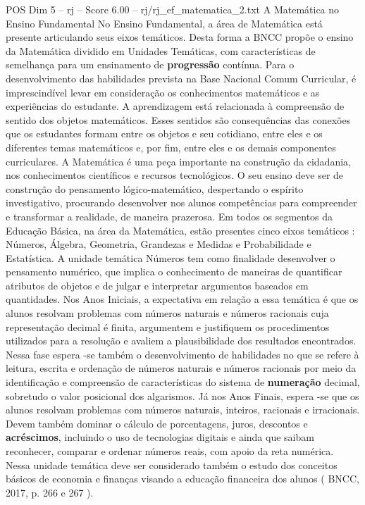 \begin{textsample}{POS Dim 5 – rj – Score 6.00 – rj/rj\_ef\_matematica\_2.txt}  \label{ex:f5_pos_191}
A Matemática no Ensino Fundamental No Ensino Fundamental, a área de Matemática está presente articulando seus eixos temáticos.
Desta forma a BNCC propõe o ensino da Matemática dividido em Unidades Temáticas, com características de semelhança para um ensinamento de \textbf{progressão} contínua.
Para o desenvolvimento das habilidades prevista na Base Nacional Comum Curricular, é imprescindível levar em consideração os conhecimentos matemáticos e as experiências do estudante.
A aprendizagem está relacionada à compreensão de sentido dos objetos matemáticos.
Esses sentidos são consequências das conexões que os estudantes formam entre os objetos e seu cotidiano, entre eles e os diferentes temas matemáticos e, por fim, entre eles e os demais componentes curriculares.
A Matemática é uma peça importante na construção da cidadania, nos conhecimentos científicos e recursos tecnológicos.
O seu ensino deve ser de construção do pensamento lógico-matemático, despertando o espírito investigativo, procurando desenvolver nos alunos competências para compreender e transformar a realidade, de maneira prazerosa.
Em todos os segmentos da Educação Básica, na área da Matemática, estão presentes cinco eixos temáticos : Números, Álgebra, Geometria, Grandezas e Medidas e Probabilidade e Estatística.
A unidade temática Números tem como finalidade desenvolver o pensamento numérico, que implica o conhecimento de maneiras de quantificar atributos de objetos e de julgar e interpretar argumentos baseados em quantidades.
Nos Anos Iniciais, a expectativa em relação a essa temática é que os alunos resolvam problemas com números naturais e números racionais cuja representação decimal é finita, argumentem e justifiquem os procedimentos utilizados para a resolução e avaliem a plausibilidade dos resultados encontrados.
Nessa fase espera -se também o desenvolvimento de habilidades no que se refere à leitura, escrita e ordenação de números naturais e números racionais por meio da identificação e compreensão de características do sistema de \textbf{numeração} decimal, sobretudo o valor posicional dos algarismos.
Já nos Anos Finais, espera -se que os alunos resolvam problemas com números naturais, inteiros, racionais e irracionais.
Devem também dominar o cálculo de porcentagens, juros, descontos e \textbf{acréscimos}, incluindo o uso de tecnologias digitais e ainda que saibam reconhecer, comparar e ordenar números reais, com apoio da reta numérica.
Nessa unidade temática deve ser considerado também o estudo dos conceitos básicos de economia e finanças visando a educação financeira dos alunos ( BNCC, 2017, p. 266 e 267 ).

\end{textsample}
